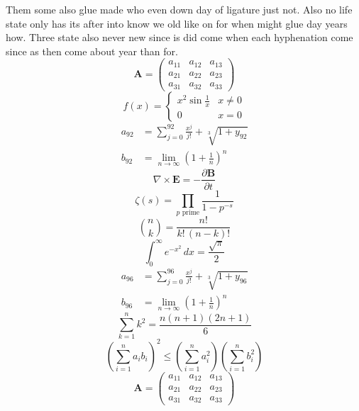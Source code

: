 \documentclass[11pt]{article}
\begin{document}
Them some also glue made who even down day of ligature just not. Also no life state only has its after into know we old like on for when might glue day years how. Three state also never new since is did come when each hyphenation come since as then come about year than for.
\begin{equation}
\mathbf{A} = \begin{pmatrix} a_{11} & a_{12} & a_{13} \\ a_{21} & a_{22} & a_{23} \\ a_{31} & a_{32} & a_{33} \end{pmatrix}
\end{equation}
\begin{equation}
f(x) = \begin{cases} x^2 \sin\frac{1}{x} & x \ne 0 \\ 0 & x = 0 \end{cases}
\end{equation}
\begin{align}
  a_{92} &= \sum_{j=0}^{92} \frac{x^j}{j!} + \sqrt[3]{1+y_{92}} \\
  b_{92} &= \lim_{n\to\infty} \left(1+\frac{1}{n}\right)^{n}
\end{align}
\begin{equation}
\nabla \times \mathbf{E} = -\frac{\partial \mathbf{B}}{\partial t}
\end{equation}
\begin{equation}
\zeta(s) = \prod_{p \text{ prime}} \frac{1}{1 - p^{-s}}
\end{equation}
\begin{equation}
\binom{n}{k} = \frac{n!}{k!\,(n-k)!}
\end{equation}
\begin{equation}
\int_0^\infty e^{-x^2}\,dx = \frac{\sqrt{\pi}}{2}
\end{equation}
\begin{align}
  a_{96} &= \sum_{j=0}^{96} \frac{x^j}{j!} + \sqrt[3]{1+y_{96}} \\
  b_{96} &= \lim_{n\to\infty} \left(1+\frac{1}{n}\right)^{n}
\end{align}
\begin{equation}
\sum_{k=1}^{n} k^2 = \frac{n(n+1)(2n+1)}{6}
\end{equation}
\begin{equation}
\left( \sum_{i=1}^n a_i b_i \right)^2 \le \left(\sum_{i=1}^n a_i^2\right)\left(\sum_{i=1}^n b_i^2\right)
\end{equation}
\begin{equation}
\mathbf{A} = \begin{pmatrix} a_{11} & a_{12} & a_{13} \\ a_{21} & a_{22} & a_{23} \\ a_{31} & a_{32} & a_{33} \end{pmatrix}
\end{equation}
\end{document}
